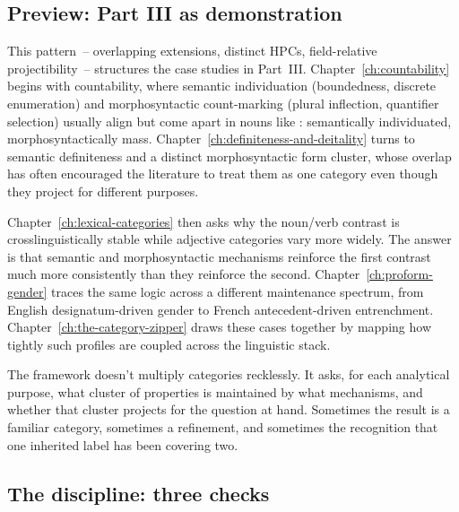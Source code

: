 \subsection{Preview: Part III as demonstration}
\label{sec:7:preview-part-iii}

This pattern~-- overlapping extensions, distinct HPCs, field-relative projectibility~-- structures the case studies in Part~III. Chapter~\ref{ch:countability} begins with countability, where semantic individuation (boundedness, discrete enumeration) and morphosyntactic count-marking (plural inflection, quantifier selection) usually align but come apart in nouns like : semantically individuated, morphosyntactically mass. Chapter~\ref{ch:definiteness-and-deitality} turns to semantic definiteness and a distinct morphosyntactic form cluster, whose overlap has often encouraged the literature to treat them as one category even though they project for different purposes.

Chapter~\ref{ch:lexical-categories} then asks why the noun/verb contrast is crosslinguistically stable while adjective categories vary more widely. The answer is that semantic and morphosyntactic mechanisms reinforce the first contrast much more consistently than they reinforce the second. Chapter~\ref{ch:proform-gender} traces the same logic across a different maintenance spectrum, from English designatum-driven gender to French antecedent-driven entrenchment. Chapter~\ref{ch:the-category-zipper} draws these cases together by mapping how tightly such profiles are coupled across the linguistic stack.

The framework doesn't multiply categories recklessly. It asks, for each analytical purpose, what cluster of properties is maintained by what mechanisms, and whether that cluster projects for the question at hand. Sometimes the result is a familiar category, sometimes a refinement, and sometimes the recognition that one inherited label has been covering two.

\subsection{The discipline: three checks}
\label{sec:7:three-checks}

